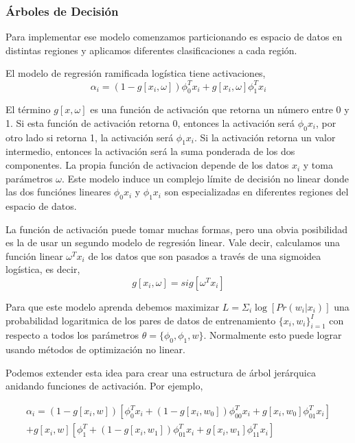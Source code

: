 \documentclass[letter,12pt]{report}
\begin{document}
\subsubsection{Árboles de Decisión}
Para implementar ese modelo \cite{Trees} comenzamos particionando es espacio de datos en distintas
regiones y aplicamos diferentes clasificaciones a cada región.

El modelo de regresión ramificada logística tiene activaciones,
$$\alpha_i=(1-g[x_i,\omega])\phi_0^T x_i+g[x_i,\omega]\phi_1^T x_i$$

El término $g[x,\omega]$ es una función de activación que retorna un número entre 0 y 1.
Si esta función de activación retorna 0, entonces la activación será $\phi_0x_i$, por
otro lado si retorna 1, la activación será $\phi_1x_i$. Si la activación retorna un valor
intermedio, entonces la activación será la suma ponderada de los dos componentes. La
propia función de activacion depende de los datos $x_i$ y toma parámetros $\omega$. Este
modelo induce un complejo límite de decisión no linear donde las dos funciónes lineares
$\phi_0x_i$ y $\phi_1x_i$ son especializadas en diferentes regiones del espacio de datos.

La función de activación puede tomar muchas formas, pero una obvia posibilidad es la de
usar un segundo modelo de regresión linear. Vale decir, calculamos una función linear
$\omega^Tx_i$ de los datos que son pasados a través de una sigmoidea logística, es decir,
$$g[x_i,\omega]=sig[\omega^Tx_i]$$

Para que este modelo aprenda debemos maximizar $L = \Sigma_i \log[Pr(w_i|x_i)]$ una
probabilidad logaritmica de los pares de datos de entrenamiento $\{x_i,w_i\}_{i=1}^I$ con
respecto a todos los parámetros $\theta=\{\phi_0,\phi_1,w\}$. Normalmente esto puede
lograr usando métodos de optimización no linear.

Podemos extender esta idea para crear una estructura de árbol jerárquica anidando
funciones de activación. Por ejemplo,

\begin{equation}
    \begin{split}
        \alpha_i = (1-g[x_i, w]) \left[\phi_0^Tx_i+(1 - g[x_i,
        w_0])\phi_{00}^Tx_i+g[x_i,w_0]\phi_{01}^Tx_i\right] \\
        + g[x_i,w]\left[\phi_1^T + (1 -
        g[x_i, w_1])\phi_{01}^Tx_i + g[x_i, w_1]\phi_{11}^Tx_i\right]
    \end{split}
\end{equation}
\end{document}
